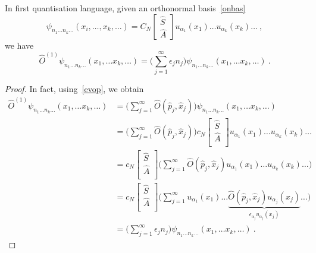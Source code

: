     In first quantisation language, given an orthonormal basis~\eqref{onbas}
    \begin{equation*}
        \psi_{n_1 \ldots n_k \ldots} (x_i, \ldots, x_k, \ldots) = C_N \begin{bmatrix}
            \hat S \\ \hat A
        \end{bmatrix} u_{\alpha_1} (x_1) \ldots u_{\alpha_k}(x_k) \ldots ~,
    \end{equation*}
    we have
    \begin{equation*}
        \hat O^{(1)} \psi_{n_1 \ldots n_k \ldots} (x_1, \ldots x_k, \ldots) = \Big (\sum_{j=1}^{\infty} \epsilon_j n_j \Big ) \psi_{n_1 \ldots n_k \ldots} (x_1, \ldots x_k, \ldots) ~.
    \end{equation*}
    \begin{proof}
    In fact, using~\eqref{evop}, we obtain
    \begin{equation*}
    \begin{aligned}
        \hat O^{(1)} \psi_{n_1 \ldots n_k \ldots} (x_1, \ldots x_k, \ldots) & = \Big ( \sum_{j=1}^{\infty} \hat O(\hat p_j, \hat x_j) \Big) \psi_{n_1 \ldots n_k \ldots} (x_1, \ldots x_k, \ldots) \\ & = \Big ( \sum_{j=1}^{\infty} \hat O(\hat p_j, \hat x_j) \Big) c_N \begin{bmatrix} \hat S \\ \hat A \\ \end{bmatrix} u_{\alpha_1} (x_1) \ldots u_{\alpha_k} (x_k) \ldots \\ & = c_N \begin{bmatrix} \hat S \\ \hat A \\ \end{bmatrix} \Big ( \sum_{j=1}^{\infty} \hat O(\hat p_j, \hat x_j) u_{\alpha_1} (x_1) \ldots u_{\alpha_k} (x_k) \ldots \Big) \\ & = c_N \begin{bmatrix} \hat S \\ \hat A \\ \end{bmatrix} \Big ( \sum_{j=1}^{\infty}  u_{\alpha_1} (x_1) \ldots \underbrace{\hat O(\hat p_j, \hat x_j) u_{\alpha_j} (x_j)}_{\epsilon_{\alpha_j} u_{\alpha_j} (x_j) } \ldots \Big) \\ & = \Big (\sum_{j=1}^{\infty} \epsilon_j n_j \Big ) \psi_{n_1 \ldots n_k \ldots} (x_1, \ldots x_k, \ldots) ~.
    \end{aligned}
    \end{equation*}
    \end{proof}

